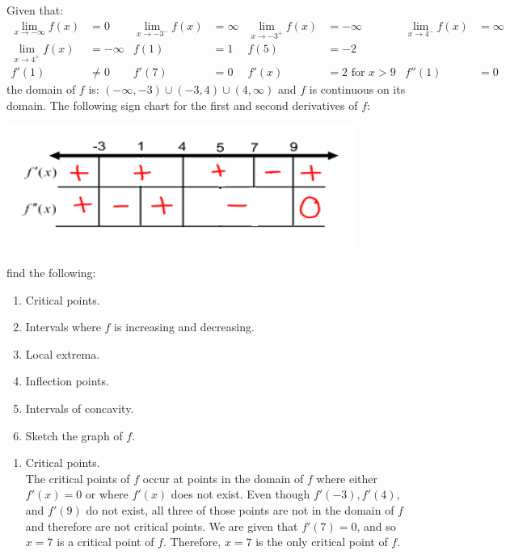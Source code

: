 \documentclass[nooutcomes]{ximera}
\begin{document}
\begin{problem}
  Given that:
  \begin{align*}
    \lim_{x \to - \infty} f(x) &= 0 & \lim_{x \to -3^-} f(x) &= \infty  & \lim_{x \to -3^+} f(x) &= - \infty & \lim_{x \to 4^-} f(x) &= \infty\\
  \lim_{x \to 4^+} f(x) &= -\infty & f(1) &= 1 & f(5) &= -2 && \\
    f'(1) &\ne 0 & f'(7) &= 0 & f'(x) &= 2 \text{ for } x > 9 & f''(1) &= 0 &
 \end{align*}
     the domain of $f$ is: $(-\infty,-3) \cup (-3,4) \cup (4,\infty)$ and $f$ is continuous on its domain.
The following sign chart for the first and second derivatives of $f$:
  \begin{image}
    \includegraphics[scale=.8]{Figure8.png}
  \end{image}
	
find the following:
  \begin{enumerate}
     \item  Critical points.
     \item  Intervals where $f$ is increasing and decreasing.
     \item  Local extrema.
     \item  Inflection points.
     \item  Intervals of concavity.
     \item  Sketch the graph of $f$.
	
  \end{enumerate}
  \begin{freeResponse}
    \begin{enumerate}
      \item
        Critical points. \\
	The critical points of $f$ occur at points in the domain of $f$ where either $f'(x)=0$ or where $f'(x)$ does not exist.  Even though $f'(-3), f'(4),$ and $f'(9)$ do not exist, all three of those points are not in the domain of $f$ and therefore are not critical points.  
        We are given that $f'(7)=0$, and so $x=7$ is a critical point of $f$.
                Therefore, $x=7$ is the only critical point of $f$.  
			

\end{enumerate}
\end{freeResponse}
\end{problem}
\end{document}
